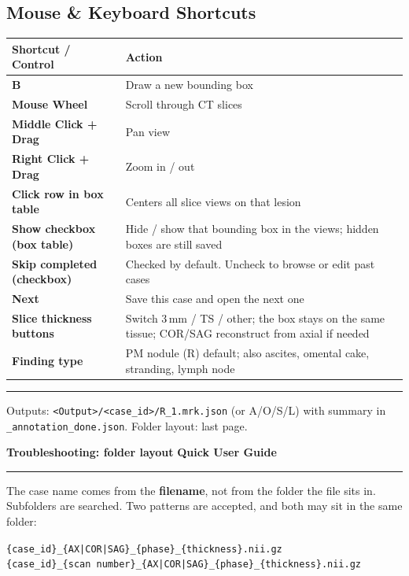 \documentclass[10pt,a4paper]{article}
\begin{document}
\subsection*{Mouse \& Keyboard Shortcuts}
\begin{center}
\small
\renewcommand{\arraystretch}{1.08}
\begin{tabular}{ll}
\toprule
\textbf{Shortcut / Control} & \textbf{Action} \\
\midrule
\textbf{B} & Draw a new bounding box \\
\textbf{Mouse Wheel} & Scroll through CT slices \\
\textbf{Middle Click + Drag} & Pan view \\
\textbf{Right Click + Drag} & Zoom in / out \\
\textbf{Click row in box table} & Centers all slice views on that lesion \\
\textbf{Show checkbox (box table)} & Hide / show that bounding box in the views; hidden boxes are still saved \\
\textbf{Skip completed (checkbox)} & Checked by default. Uncheck to browse or edit past cases \\
\textbf{Next} & Save this case and open the next one \\
\textbf{Slice thickness buttons} & Switch 3\,mm / TS / other; the box stays on the same tissue; COR/SAG reconstruct from axial if needed \\
\textbf{Finding type} & PM nodule (R) default; also ascites, omental cake, stranding, lymph node \\
\bottomrule
\end{tabular}
\end{center}

\vfill
\hrule
\vspace{0.12cm}
{\footnotesize\color{gray} Outputs: \texttt{<Output>/<case\_id>/R\_1.mrk.json} (or A/O/S/L) with summary in \texttt{\_annotation\_done.json}. Folder layout: last page.}

\newpage
{\Large\bfseries\color{darkblue} Troubleshooting: folder layout} \hfill {\small\bfseries Quick User Guide}\\[-0.2cm]
\rule{\textwidth}{0.8pt}

\vspace{0.15cm}
The case name comes from the \textbf{filename}, not from the folder the file sits in. Subfolders are searched. Two patterns are accepted, and both may sit in the same folder:

\begin{center}
\small
\texttt{\{case\_id\}\_\{AX|COR|SAG\}\_\{phase\}\_\{thickness\}.nii.gz}\\[0.15em]
\texttt{\{case\_id\}\_\{scan number\}\_\{AX|COR|SAG\}\_\{phase\}\_\{thickness\}.nii.gz}
\end{center}
\end{document}
